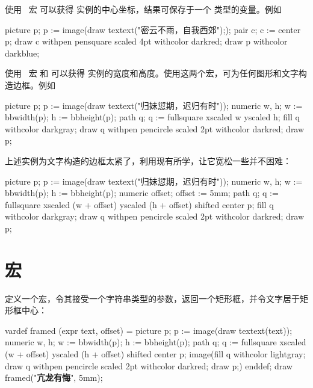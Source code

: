 使用 \METAPOST\ 宏  可以获得  实例的中心坐标，结果可保存于一个  类型的变量。例如

\startexample
\startMPcode
picture p; p := image(draw textext("密云不雨，自我西郊"););
pair c; c := center p;
draw c withpen pensquare scaled 4pt withcolor darkred;
draw p withcolor darkblue;
\stopMPcode
\stopexample
\simpleexample[option=MP]{\getexample}

使用 \MetaFun\ 宏  和  可以获得  实例的宽度和高度。使用这两个宏，可为任何图形和文字构造边框。例如

\startexample
\startMPcode
picture p; p := image(draw textext("归妹愆期，迟归有时"));
numeric w, h; w := bbwidth(p); h := bbheight(p);
path q; q := fullsquare xscaled w yscaled h;
fill q withcolor darkgray;
draw q withpen pencircle scaled 2pt withcolor darkred;
draw p;
\stopMPcode
\stopexample
\simpleexample[option=MP]{\getexample}

\noindent 上述实例为文字构造的边框太紧了，利用现有所学，让它宽松一些并不困难：

\startexample
\startMPcode
picture p; p := image(draw textext("归妹愆期，迟归有时"));
numeric w, h; w := bbwidth(p); h := bbheight(p);
numeric offset; offset := 5mm;
path q;
q := fullsquare xscaled (w + offset)
                yscaled (h + offset)
                shifted center p;
fill q withcolor darkgray;
draw q withpen pencircle scaled 2pt withcolor darkred;
draw p;
\stopMPcode
\stopexample
\simpleexample[option=MP]{\getexample}

\section[macro]{宏}

定义一个宏，令其接受一个字符串类型的参数，返回一个矩形框，并令文字居于矩形框中心：

\startexample
\startMPcode
vardef framed (expr text, offset) =
  picture p; p := image(draw textext(text));
  numeric w, h; w := bbwidth(p); h := bbheight(p);
  path q;
  q := fullsquare xscaled (w + offset) yscaled (h + offset) shifted center p;
  image(fill q withcolor lightgray;
        draw q withpen pencircle scaled 2pt withcolor darkred;
        draw p;)
enddef;
draw framed("{\bf 亢龙有悔}", 5mm);
\stopMPcode
\stopexample
\simpleexample[option=MP]{\getexample}

